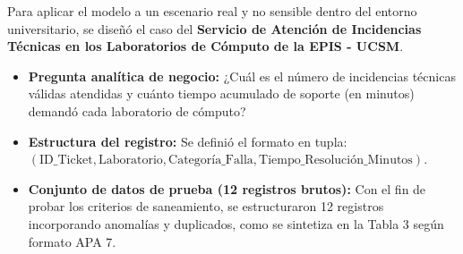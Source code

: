 \documentclass[12pt,a4paper]{article}
\begin{document}
Para aplicar el modelo a un escenario real y no sensible dentro del entorno universitario, se diseñó el caso del \textbf{Servicio de Atención de Incidencias Técnicas en los Laboratorios de Cómputo de la EPIS - UCSM}.

\begin{itemize}
    \item \textbf{Pregunta analítica de negocio:} ¿Cuál es el número de incidencias técnicas válidas atendidas y cuánto tiempo acumulado de soporte (en minutos) demandó cada laboratorio de cómputo?
    \item \textbf{Estructura del registro:} Se definió el formato en tupla: \\
    $(\text{ID\_Ticket}, \text{Laboratorio}, \text{Categoría\_Falla}, \text{Tiempo\_Resolución\_Minutos})$.
    \item \textbf{Conjunto de datos de prueba (12 registros brutos):} Con el fin de probar los criterios de saneamiento, se estructuraron 12 registros incorporando anomalías y duplicados, como se sintetiza en la Tabla 3 según formato APA 7.
\end{itemize}
\end{document}
